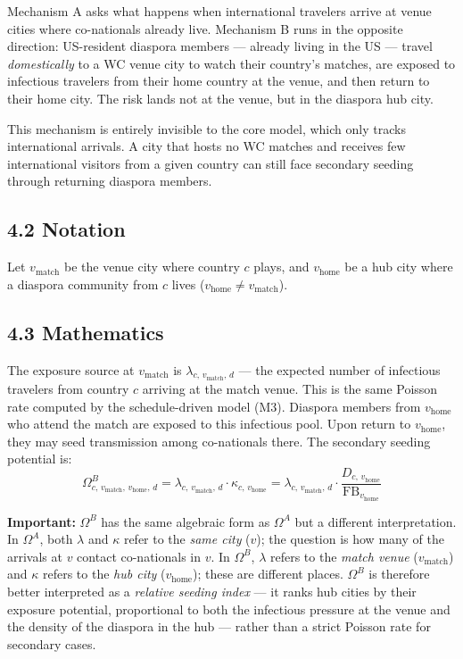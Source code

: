 \documentclass[11pt]{article}
\begin{document}
Mechanism A asks what happens when international travelers arrive at venue
cities where co-nationals already live. Mechanism B runs in the opposite
direction: US-resident diaspora members --- already living in the US ---
travel \emph{domestically} to a WC venue city to watch their country's
matches, are exposed to infectious travelers from their home country at
the venue, and then return to their home city. The risk lands not at
the venue, but in the diaspora hub city.

This mechanism is entirely invisible to the core model, which only tracks
international arrivals. A city that hosts no WC matches and receives few
international visitors from a given country can still face secondary
seeding through returning diaspora members.

\subsection*{4.2 Notation}

Let $v_{\text{match}}$ be the venue city where country $c$ plays, and
$v_{\text{home}}$ be a hub city where a diaspora community from $c$ lives
($v_{\text{home}} \neq v_{\text{match}}$).

\subsection*{4.3 Mathematics}

The exposure source at $v_{\text{match}}$ is $\lambda_{c,\,v_{\text{match}},\,d}$
--- the expected number of infectious travelers from country $c$ arriving
at the match venue. This is the same Poisson rate computed by the
schedule-driven model (M3). Diaspora members from $v_{\text{home}}$ who
attend the match are exposed to this infectious pool. Upon return to
$v_{\text{home}}$, they may seed transmission among co-nationals there.
The secondary seeding potential is:
\begin{equation}
  \Omega^B_{c,\,v_{\text{match}},\,v_{\text{home}},\,d}
    = \lambda_{c,\,v_{\text{match}},\,d}
      \cdot \kappa_{c,\,v_{\text{home}}}
    = \lambda_{c,\,v_{\text{match}},\,d}
      \cdot \frac{D_{c,\,v_{\text{home}}}}{\mathrm{FB}_{v_{\text{home}}}}
  \label{eq:omegaB}
\end{equation}

\textbf{Important:} $\Omega^B$ has the same algebraic form as $\Omega^A$
but a different interpretation. In $\Omega^A$, both $\lambda$ and
$\kappa$ refer to the \emph{same city} ($v$); the question is how many
of the arrivals at $v$ contact co-nationals in $v$. In $\Omega^B$,
$\lambda$ refers to the \emph{match venue} ($v_{\text{match}}$) and
$\kappa$ refers to the \emph{hub city} ($v_{\text{home}}$); these are
different places. $\Omega^B$ is therefore better interpreted as a
\emph{relative seeding index} --- it ranks hub cities by their exposure
potential, proportional to both the infectious pressure at the venue
and the density of the diaspora in the hub --- rather than a strict
Poisson rate for secondary cases.
\end{document}

